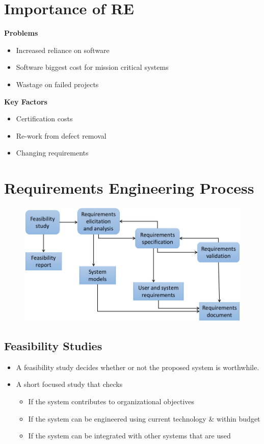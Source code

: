 \documentclass{report}
\begin{document}
\section{Importance of RE}
\vspace{-1em}
\begin{multicols}{2}
\textbf{Problems}
\begin{itemize}
  \item Increased reliance on software
  \item Software biggest cost for mission critical systems
  \item Wastage on failed projects
\end{itemize}
\textbf{Key Factors}
\begin{itemize}
  \item Certification costs
  \item Re-work from defect removal
  \item Changing requirements
\end{itemize}
\end{multicols}

\section{Requirements Engineering Process}
\begin{multicols}{2}
\begin{figure}[H]
\centering
\includegraphics[scale=.3,trim=1cm 1cm 1cm 1cm]{assets/CEN4010_RE_Process.jpg}
\end{figure}
\subsection{Feasibility Studies}
\begin{itemize}
  \item A feasibility study decides whether or not the proposed
system is worthwhile.
  \item A short focused study that checks
  \begin{itemize}
    \item If the system contributes to organizational objectives
    \item If the system can be engineered using current technology \& within budget
    \item If the system can be integrated with other systems that are used
  \end{itemize}
\end{itemize}
\end{multicols}
\end{document}
